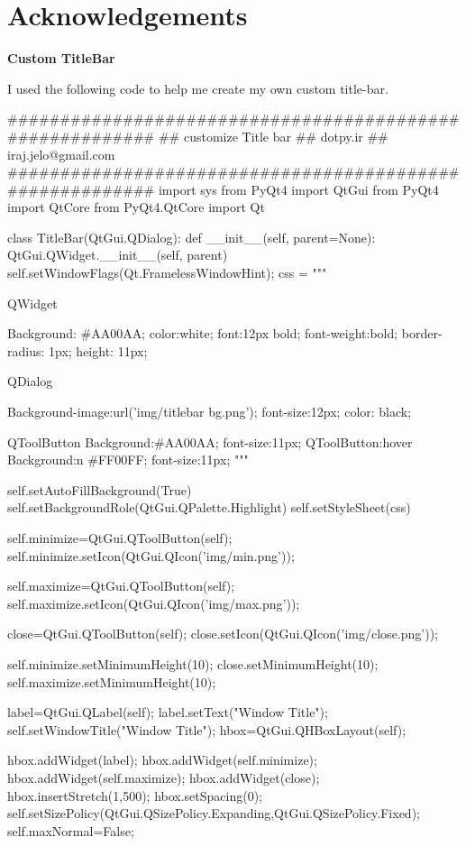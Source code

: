 \section{Acknowledgements}

\textbf{Custom TitleBar}


I used the following code to help me create my own custom title-bar.

{\scriptsize
\begin{python}
#########################################################
## customize Title bar
## dotpy.ir
## iraj.jelo@gmail.com
#########################################################
import sys
from PyQt4 import QtGui
from PyQt4 import QtCore
from PyQt4.QtCore import Qt


class TitleBar(QtGui.QDialog):
    def __init__(self, parent=None):
        QtGui.QWidget.__init__(self, parent)
        self.setWindowFlags(Qt.FramelessWindowHint);
        css = """

QWidget
{
Background: #AA00AA;
color:white;
font:12px bold;
font-weight:bold;
border-radius: 1px;
height: 11px;

}
QDialog{
Background-image:url('img/titlebar bg.png');
font-size:12px;
color: black;

}
QToolButton{
Background:#AA00AA;
font-size:11px;
}
QToolButton:hover{
Background:n #FF00FF;
font-size:11px;
}
"""

        self.setAutoFillBackground(True)
        self.setBackgroundRole(QtGui.QPalette.Highlight)
        self.setStyleSheet(css) 

        self.minimize=QtGui.QToolButton(self);
        self.minimize.setIcon(QtGui.QIcon('img/min.png'));

        self.maximize=QtGui.QToolButton(self);
        self.maximize.setIcon(QtGui.QIcon('img/max.png'));

        close=QtGui.QToolButton(self);
        close.setIcon(QtGui.QIcon('img/close.png'));

        self.minimize.setMinimumHeight(10);
        close.setMinimumHeight(10);
        self.maximize.setMinimumHeight(10);

        label=QtGui.QLabel(self);
        label.setText("Window Title");
        self.setWindowTitle("Window Title");
        hbox=QtGui.QHBoxLayout(self);

        hbox.addWidget(label);
        hbox.addWidget(self.minimize);
        hbox.addWidget(self.maximize);
        hbox.addWidget(close);
        hbox.insertStretch(1,500);
        hbox.setSpacing(0);
        self.setSizePolicy(QtGui.QSizePolicy.Expanding,QtGui.QSizePolicy.Fixed);
        self.maxNormal=False;


\end{python}}
